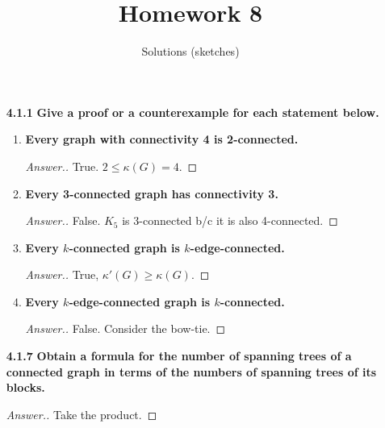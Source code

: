 \documentclass[11pt]{amsart}
\title{Homework 8}
\author{Solutions (sketches)}
\theoremstyle{plain}
\theoremstyle{definition}
\theoremstyle{example}
\begin{document}
\maketitle

\begin{enumerate}[\qquad]
\item[\bf 4.1.1] {\bf Give a proof or a counterexample for each statement below.}\\

\begin{enumerate}[\bf (a)]
\item {\bf Every graph with connectivity 4 is 2-connected.}
\begin{proof}[Answer.] True. $2 \leq \kappa(G) = 4$. 


\end{proof}

\item {\bf Every 3-connected graph has connectivity 3.}
\begin{proof}[Answer.] False. $K_5$ is 3-connected b/c it is also 4-connected. 


\end{proof}

\item {\bf Every $k$-connected graph is $k$-edge-connected.}
\begin{proof}[Answer.]
True, $\kappa'(G) \geq \kappa(G)$. 

\end{proof}

\item {\bf Every $k$-edge-connected graph is $k$-connected.}
\begin{proof}[Answer.]
False. Consider the bow-tie. 
\end{proof}

\end{enumerate}

\bigskip




\item[\bf 4.1.7] {\bf Obtain a formula for the number of spanning trees of a connected graph in terms of the numbers of spanning trees of its blocks.}\\

\begin{proof}[Answer.]
Take the product. 

\end{proof}

\bigskip





\end{enumerate}
\end{document}
